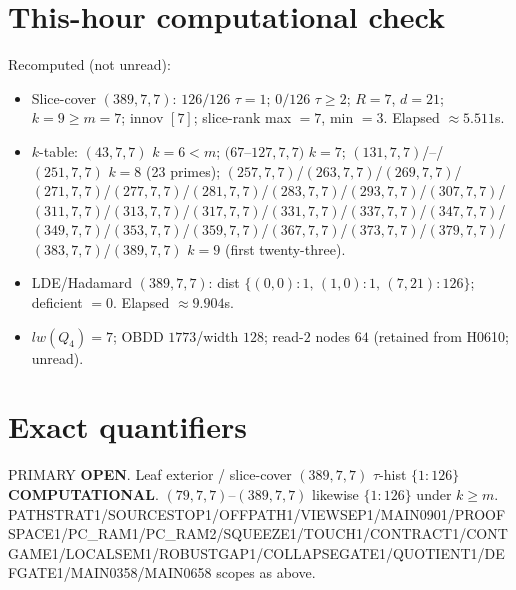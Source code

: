 \documentclass[11pt]{article}
\begin{document}
\section*{This-hour computational check}
Recomputed (not unread):
\begin{itemize}
\item Slice-cover $(389,7,7)$: $126/126$ $\tau{=}1$; $0/126$ $\tau{\ge}2$; $R{=}7$, $d{=}21$;
  $k{=}9{\ge}m{=}7$; innov $[7]$; slice-rank max $=7$, min $=3$. Elapsed $\approx5.511$s.
\item $k$-table: $(43,7,7)$ $k{=}6{<}m$; $(67$--$127,7,7)$ $k{=}7$;
  $(131,7,7)$/--/$(251,7,7)$ $k{=}8$ (23 primes); $(257,7,7)$/$(263,7,7)$/$(269,7,7)$/$(271,7,7)$/$(277,7,7)$/$(281,7,7)$/$(283,7,7)$/$(293,7,7)$/$(307,7,7)$/$(311,7,7)$/$(313,7,7)$/$(317,7,7)$/$(331,7,7)$/$(337,7,7)$/$(347,7,7)$/$(349,7,7)$/$(353,7,7)$/$(359,7,7)$/$(367,7,7)$/$(373,7,7)$/$(379,7,7)$/$(383,7,7)$/$(389,7,7)$ $k{=}9$ (first twenty-three).
\item LDE/Hadamard $(389,7,7)$: dist $\{(0,0){:}1,\,(1,0){:}1,\,(7,21){:}126\}$; deficient $=0$. Elapsed $\approx9.904$s.
\item $lw(Q_4)=7$; OBDD $1773$/width $128$; read-$2$ nodes $64$ (retained from H0610; unread).
\end{itemize}

\section*{Exact quantifiers}
PRIMARY \textbf{OPEN}. Leaf exterior / slice-cover $(389,7,7)$ $\tau$-hist $\{1{:}126\}$ \textbf{COMPUTATIONAL}.
$(79,7,7)$--$(389,7,7)$ likewise $\{1{:}126\}$ under $k{\ge}m$.
PATHSTRAT1/SOURCESTOP1/OFFPATH1/VIEWSEP1/MAIN0901/PROOFSPACE1/PC\_RAM1/PC\_RAM2/SQUEEZE1/TOUCH1/CONTRACT1/CONTGAME1/LOCALSEM1/ROBUSTGAP1/COLLAPSEGATE1/QUOTIENT1/DEFGATE1/MAIN0358/MAIN0658 scopes as above.
\end{document}
